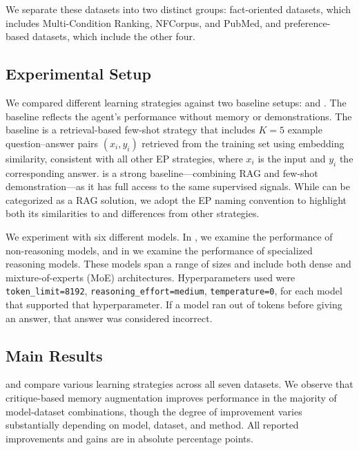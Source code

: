 We separate these datasets into two distinct groups: fact-oriented datasets, which includes Multi-Condition Ranking, NFCorpus, and PubMed, and preference-based datasets, which include the other four.

\subsection{Experimental Setup}

We compared different learning strategies against two baseline setups: \ZEROSHOT{} and \EPLABEL{}. The \ZEROSHOT{} baseline reflects the agent's performance without memory or demonstrations. The \EPLABEL{} baseline is a retrieval-based few-shot strategy that includes $K=5$ example question–answer pairs $(x_i, y_i)$ retrieved from the training set using embedding similarity, consistent with all other EP strategies, where $x_i$ is the input and $y_i$ the corresponding answer. \EPLABEL{} is a strong baseline—combining RAG and few-shot demonstration—as it has full access to the same supervised signals. While \EPLABEL{} can be categorized as a RAG solution, we adopt the EP naming convention to highlight both its similarities to and differences from other strategies.

We experiment with six different models. In , we examine the performance of non-reasoning models, and in  we examine the performance of specialized reasoning models.
These models span a range of sizes and include both dense and mixture-of-experts (MoE) architectures. Hyperparameters used were \texttt{token\_limit=8192}, \texttt{reasoning\_effort=medium}, \texttt{temperature=0}, for each model that supported that hyperparameter. If a model ran out of tokens before giving an answer, that answer was considered incorrect.



\subsection{Main Results}
\label{sec:main_results}

 and  compare various learning strategies across all seven datasets. We observe that critique-based memory augmentation improves performance in the majority of model-dataset combinations, though the degree of improvement varies substantially depending on model, dataset, and method. All reported improvements and gains are in absolute percentage points.

